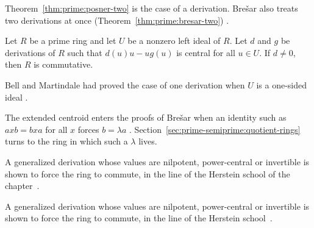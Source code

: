 Theorem~\ref{thm:prime:posner-two} is the case of a derivation. Bre\v{s}ar also
treats two derivations at once (Theorem~\ref{thm:prime:bresar-two}) \cite[Theorem~B, p.~386]{Bresar1993}.

\begin{theorem}\label{thm:prime:bresar-two}
Let $R$ be a prime ring and let $U$ be a nonzero left ideal of $R$. Let $d$ and
$g$ be derivations of $R$ such that $d(u)u-ug(u)$ is central for all $u\in U$.
If $d\neq 0$, then $R$ is commutative.
\end{theorem}

Bell and Martindale had proved the case of one derivation when $U$ is a
one-sided ideal \cite[p.~386]{Bresar1993}.

The extended centroid enters the proofs of Bre\v{s}ar when an identity such as
$axb=bxa$ for all $x$ forces $b=\lambda a$ \cite[Remark~6, p.~387]{Bresar1993}.
Section~\ref{sec:prime-semiprime:quotient-rings} turns to the ring in which such
a $\lambda$ lives.

A generalized derivation whose values are nilpotent, power-central or invertible is shown to force the ring to commute, in the line of the Herstein school of the chapter~\cite{WlGeneralizedDerivationsWith2019}.

A generalized derivation whose values are nilpotent, power-central or invertible is shown to force the ring to commute, in the line of the Herstein school~\cite{WlGeneralizedDerivationsWithNilp2019}.
